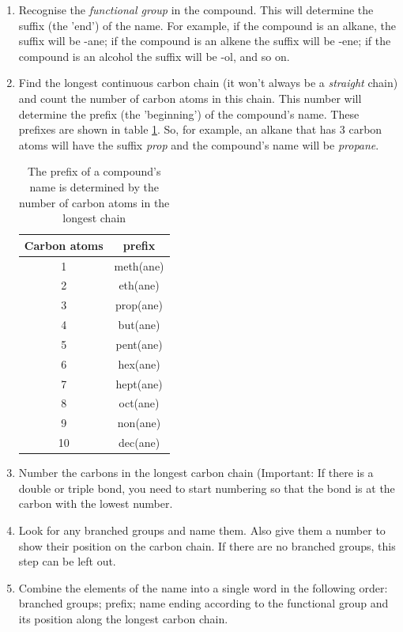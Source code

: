 \begin{enumerate}[label=\textbf{Step \arabic*}:]
\item{Recognise the \textit{functional group} in the compound. This will determine the suffix (the 'end') of the name. For example, if the compound is an alkane, the suffix will be -ane; if the compound is an alkene the suffix will be -ene; if the compound is an alcohol the suffix will be -ol, and so on.}
\item{Find the longest continuous carbon chain (it won't always be a \textit{straight} chain) and count the number of carbon atoms in this chain. This number will determine the prefix (the 'beginning') of the compound's name. These prefixes are shown in table \ref{tab:prefix}. So, for example, an alkane that has 3 carbon atoms will have the suffix \textit{prop} and the compound's name will be \textit{propane}.

\begin{table}[!h]
\begin{center}
\begin{tabular}{|c|c|}\hline
\textbf{Carbon atoms} & prefix \\\hline

1 & meth(ane)\\\hline
2 & eth(ane)\\\hline
3 & prop(ane)\\\hline
4 & but(ane) \\\hline
5 & pent(ane) \\\hline
6 & hex(ane) \\\hline
7 & hept(ane) \\\hline
8 & oct(ane) \\\hline
9 & non(ane) \\\hline
10 & dec(ane) \\\hline
\end{tabular}
\end{center}
\caption{The prefix of a compound's name is determined by the number of carbon atoms in the longest chain}
\label{tab:prefix}
\end{table}
}
\item{Number the carbons in the longest carbon chain (Important: If there is a double or triple bond, you need to start numbering so that the bond is at the carbon with the lowest number.}
\item{Look for any branched groups and name them. Also give them a number to show their position on the carbon chain. If there are no branched groups, this step can be left out.}
\item{Combine the elements of the name into a single word in the following order: branched groups; prefix; name ending according to the functional group and its position along the longest carbon chain.}
\end{enumerate}
